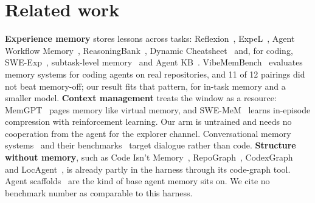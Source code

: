 \documentclass[11pt]{article}
\begin{document}
\section{Related work}
\textbf{Experience memory} stores lessons across tasks: Reflexion~\citep{shinn2023reflexion},
ExpeL~\citep{zhao2023expel}, Agent Workflow Memory~\citep{wang2024awm},
ReasoningBank~\citep{ouyang2025reasoningbank}, Dynamic Cheatsheet~\citep{suzgun2025dynamiccheatsheet}
and, for coding, SWE-Exp~\citep{chen2025sweexp}, subtask-level memory~\citep{shen2026subtask} and
Agent KB~\citep{tang2025agentkb}. VibeMemBench~\citep{fan2026vibemembench} evaluates memory systems
for coding agents on real repositories, and 11 of 12 pairings did not beat memory-off; our result
fits that pattern, for in-task memory and a smaller model. \textbf{Context management} treats the
window as a resource: MemGPT~\citep{packer2023memgpt} pages memory like virtual memory, and
SWE-MeM~\citep{gao2026swemem} learns in-episode compression with reinforcement learning. Our arm is
untrained and needs no cooperation from the agent for the explorer channel. Conversational memory
systems~\citep{chhikara2025mem0,rasmussen2025zep,latimer2025hindsight} and their
benchmarks~\citep{wu2024longmemeval} target dialogue rather than code. \textbf{Structure without
memory}, such as Code Isn't Memory~\citep{bhola2026codeisntmemory},
RepoGraph~\citep{ouyang2024repograph}, CodexGraph~\citep{liu2024codexgraph} and
LocAgent~\citep{chen2025locagent}, is already partly in the harness through its code-graph tool.
Agent scaffolds~\citep{yang2024sweagent,xia2024agentless} are the kind of base agent memory sits on.
We cite no benchmark number as comparable to this harness.
\end{document}
